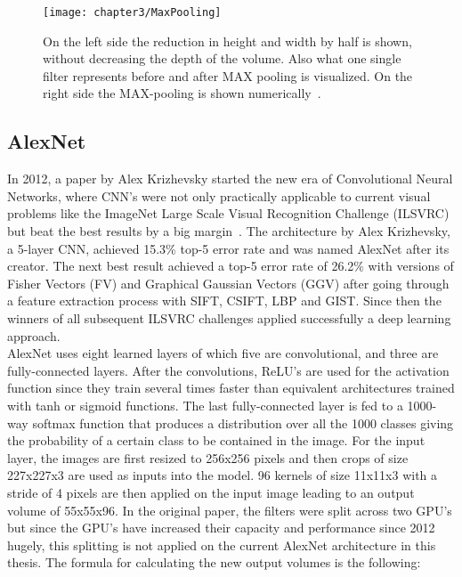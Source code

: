 \begin{figure}[!h]
  \centering
  \caption{On the left side the reduction in height and width by half is shown, without decreasing the depth of the volume. Also what one single filter represents before and after MAX pooling is visualized. On the right side the MAX-pooling is shown numerically~\cite{cs231convnetworks}.}
  \texttt{[image: chapter3/MaxPooling]}
  \label{fig:MaxPooling}
\end{figure}

\quad

\subsection{AlexNet}

In 2012, a paper by Alex Krizhevsky started the new era of Convolutional Neural Networks, where CNN's were not only practically applicable to current visual problems like the ImageNet Large Scale Visual Recognition Challenge (ILSVRC) but beat the best results by a big margin~\cite{krizhevsky2012imagenet, imagenet}. The architecture by Alex Krizhevsky, a 5-layer CNN, achieved 15.3\% top-5 error rate and was named AlexNet after its creator. The next best result achieved a top-5 error rate of 26.2\% with versions of Fisher Vectors (FV) and Graphical Gaussian Vectors (GGV) after going through a feature extraction process with SIFT, CSIFT, LBP and GIST. Since then the winners of all subsequent ILSVRC challenges applied successfully a deep learning approach. \\

AlexNet uses eight learned layers of which five are convolutional, and three are fully-connected layers. After the convolutions, ReLU's are used for the activation function since they train several times faster than equivalent architectures trained with tanh or sigmoid functions. The last fully-connected layer is fed to a 1000-way softmax function that produces a distribution over all the 1000 classes giving the probability of a certain class to be contained in the image. For the input layer, the images are first resized to 256x256 pixels and then crops of size 227x227x3 are used as inputs into the model. 96 kernels of size 11x11x3 with a stride of 4 pixels are then applied on the input image leading to an output volume of 55x55x96. In the original paper, the filters were split across two GPU's but since the GPU's have increased their capacity and performance since 2012 hugely, this splitting is not applied on the current AlexNet architecture in this thesis. The formula for calculating the new output volumes is the following: \\

